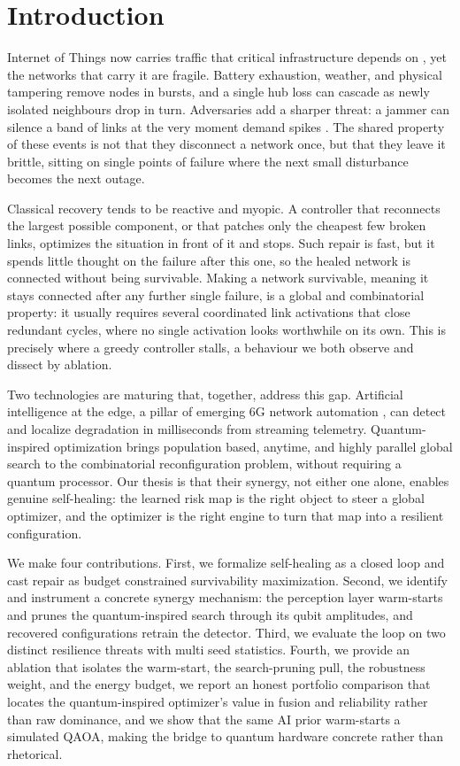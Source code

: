 \documentclass[journal]{IEEEtran}
\begin{document}
\section{Introduction}\label{sec:intro}

 Internet of Things now carries traffic that critical infrastructure depends on \cite{ref1}, yet the networks that carry it are fragile. Battery exhaustion, weather, and physical tampering remove nodes in bursts, and a single hub loss can cascade as newly isolated neighbours drop in turn. Adversaries add a sharper threat: a jammer can silence a band of links at the very moment demand spikes \cite{ref11}. The shared property of these events is not that they disconnect a network once, but that they leave it brittle, sitting on single points of failure where the next small disturbance becomes the next outage.

Classical recovery tends to be reactive and myopic. A controller that reconnects the largest possible component, or that patches only the cheapest few broken links, optimizes the situation in front of it and stops. Such repair is fast, but it spends little thought on the failure after this one, so the healed network is connected without being survivable. Making a network survivable, meaning it stays connected after any further single failure, is a global and combinatorial property: it usually requires several coordinated link activations that close redundant cycles, where no single activation looks worthwhile on its own. This is precisely where a greedy controller stalls, a behaviour we both observe and dissect by ablation.

Two technologies are maturing that, together, address this gap. Artificial intelligence at the edge, a pillar of emerging 6G network automation \cite{ref7}, can detect and localize degradation in milliseconds from streaming telemetry. Quantum-inspired optimization brings population based, anytime, and highly parallel global search to the combinatorial reconfiguration problem, without requiring a quantum processor. Our thesis is that their synergy, not either one alone, enables genuine self-healing: the learned risk map is the right object to steer a global optimizer, and the optimizer is the right engine to turn that map into a resilient configuration.

We make four contributions. First, we formalize self-healing as a closed loop and cast repair as budget constrained survivability maximization. Second, we identify and instrument a concrete synergy mechanism: the perception layer warm-starts and prunes the quantum-inspired search through its qubit amplitudes, and recovered configurations retrain the detector. Third, we evaluate the loop on two distinct resilience threats with multi seed statistics. Fourth, we provide an ablation that isolates the warm-start, the search-pruning pull, the robustness weight, and the energy budget, we report an honest portfolio comparison that locates the quantum-inspired optimizer's value in fusion and reliability rather than raw dominance, and we show that the same AI prior warm-starts a simulated QAOA, making the bridge to quantum hardware concrete rather than rhetorical.
\end{document}
